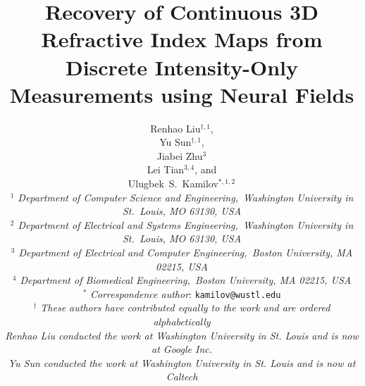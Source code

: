 \documentclass[11pt]{article}
\makeatletter
\theoremstyle{plain} %
\renewcommand{\maketitle}{\bgroup\setlength{\parindent}{0pt}
\begin{flushleft}
  \textbf{\huge\@title}
  
  \vspace{2em}
  
  {\Large\@author}
\end{flushleft}\egroup
}
\makeatother
\begin{document}
\title{Recovery of Continuous 3D Refractive Index Maps from Discrete Intensity-Only Measurements using Neural Fields}

\author{
{\LARGE Renhao Liu$^{\dagger,1}$},\\ 
\medskip
{\LARGE Yu Sun$^{\dagger,1}$},\\
\medskip
{\LARGE Jiabei Zhu$^{3}$}\\
\medskip
{\LARGE Lei Tian$^{3,4}$}, and\\
\medskip
{\LARGE Ulugbek~S.~Kamilov$^{\ast,1,2}$}\\
\vspace{1em}
\emph{$^1$ Department of Computer Science and Engineering,~Washington University in St.~Louis, MO 63130, USA}\\
\emph{$^2$ Department of Electrical and Systems Engineering,~Washington University in St.~Louis, MO 63130, USA}\\
\emph{$^3$ Department of Electrical and Computer Engineering,~Boston University, MA 02215, USA}\\
\emph{$^4$ Department of Biomedical Engineering,~Boston University, MA 02215, USA}\\
\vspace{1em}
$^{\ast}$ \emph{Correspondence author}: \texttt{kamilov@wustl.edu}\\
$^{\dagger}$ \emph{These authors have contributed equally to the work and are ordered alphabetically} \\
\vspace{1em}
\emph{Renhao Liu conducted the work at Washington University in St. Louis and is now at Google Inc.} \\
\emph{Yu Sun conducted the work at Washington University in St. Louis and is now at Caltech}
}

\date{}

\maketitle

\newpage
\end{document}
